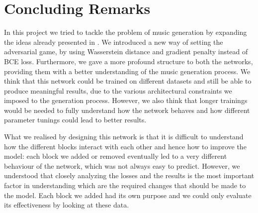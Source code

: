 
\section{Concluding Remarks}
\label{sec:conclusions}

In this project we tried to tackle the problem of music generation by expanding the ideas already presented in \cite{Yang-2017}. We introduced a new way of setting the adversarial game, by using Wasserstein distance and gradient penalty instead of BCE loss. Furthermore, we gave a more profound structure to both the networks, providing them with a better understanding of the music generation process.
We think that this network could be trained on different datasets and still be able to produce meaningful results, due to the various architectural constraints we imposed to the generation process.
However, we also think that longer trainings would be needed to fully understand how the network behaves and how different parameter tunings could lead to better results.

What we realised by designing this network is that it is difficult to understand how the different blocks interact with each other and hence how to improve the model: each block we added or removed eventually led to a very different behaviour of the network, which was not always easy to predict.
However, we understood that closely analyzing the losses and the results is the most important factor in understanding which are the required changes that should be made to the model.
Each block we added had its own purpose and we could only evaluate its effectiveness by looking at these data.